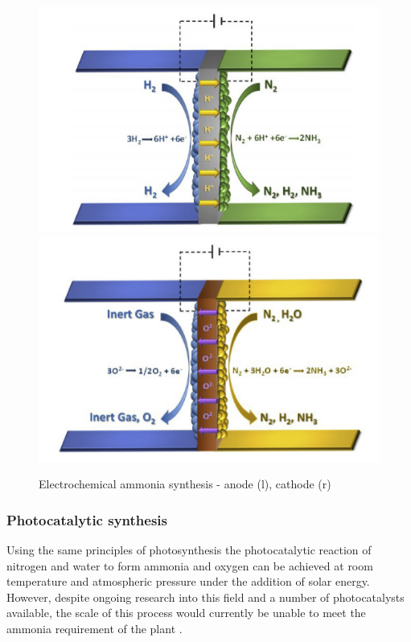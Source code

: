 \documentclass[11pt, a4paper]{article}
\begin{document}
{{\begin{figure}[h]
{			\includegraphics[scale=0.65]{electrochemical_synthesis}
			\includegraphics[scale=0.7]{electrochemical_synthesis2}	
			\caption{Electrochemical ammonia synthesis - anode (l), cathode (r)  \cite{Kyriakou2017}}
	}
\end{figure}}



\subsubsection{Photocatalytic synthesis}
Using the same principles of photosynthesis the photocatalytic reaction of nitrogen and water to form ammonia and oxygen can be achieved at room temperature and atmospheric pressure under the addition of solar energy. However, despite ongoing research into this field and a number of photocatalysts available, the scale of this process would currently be unable to meet the ammonia requirement of the plant \cite{Liu2014}.

}
\end{document}
